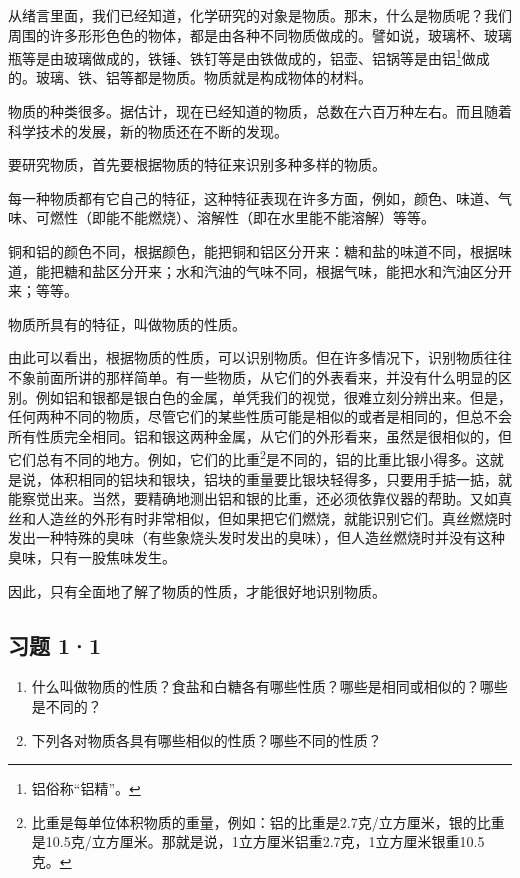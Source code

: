 从绪言里面，我们已经知道，化学研究的对象是物质。那末，什么是物质呢？我们周围的许多形形色色的物体，都是由各种不同物质做成的。譬如说，玻璃杯、玻璃瓶等是由玻璃做成的，铁锤、铁钉等是由铁做成的，铝壶、铝锅等是由铝\footnote{铝俗称``铝精''。}做成的。玻璃、铁、铝等都是物质。物质就是构成物体的材料。

物质的种类很多。据估计，现在已经知道的物质，总数在六百万种左右。而且随着科学技术的发展，新的物质还在不断的发现。

要研究物质，首先要根据物质的特征来识别多种多样的物质。

每一种物质都有它自己的特征，这种特征表现在许多方面，例如，颜色、味道、气味、可燃性（即能不能燃烧）、溶解性（即在水里能不能溶解）等等。

铜和铝的颜色不同，根据颜色，能把铜和铝区分开来：糖和盐的味道不同，根据味道，能把糖和盐区分开来；水和汽油的气味不同，根据气味，能把水和汽油区分开来；等等。

物质所具有的特征，叫做物质的性质。

由此可以看出，根据物质的性质，可以识别物质。但在许多情况下，识别物质往往不象前面所讲的那样简单。有一些物质，从它们的外表看来，并没有什么明显的区别。例如铝和银都是银白色的金属，单凭我们的视觉，很难立刻分辨出来。但是，任何两种不同的物质，尽管它们的某些性质可能是相似的或者是相同的，但总不会所有性质完全相同。铝和银这两种金属，从它们的外形看来，虽然是很相似的，但它们总有不同的地方。例如，它们的比重\footnote{比重是每单位体积物质的重量，例如：铝的比重是2.7克/立方厘米，银的比重是10.5克/立方厘米。那就是说，1立方厘米铝重2.7克，1立方厘米银重10.5克。}是不同的，铝的比重比银小得多。这就是说，体积相同的铝块和银块，铝块的重量要比银块轻得多，只要用手掂一掂，就能察觉出来。当然，要精确地测出铝和银的比重，还必须依靠仪器的帮助。又如真丝和人造丝的外形有时非常相似，但如果把它们燃烧，就能识别它们。真丝燃烧时发出一种特殊的臭味（有些象烧头发时发出的臭味），但人造丝燃烧时并没有这种臭味，只有一股焦味发生。

因此，只有全面地了解了物质的性质，才能很好地识别物质。

\subsection{习题 1·1}

\begin{enumerate}
\item
  什么叫做物质的性质？食盐和白糖各有哪些性质？哪些是相同或相似的？哪些是不同的？
\item
  下列各对物质各具有哪些相似的性质？哪些不同的性质？
\end{enumerate}

